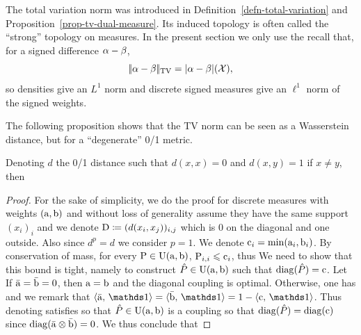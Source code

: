 The total variation norm was introduced in Definition~\ref{defn-total-variation} and Proposition~\ref{prop-tv-dual-measure}. Its induced topology is often called the ``strong'' topology on measures. In the present section we only use the recall that, for a signed difference $\al-\be$,
\[
	\norm{\al-\be}_{\TV}=|\al-\be|(\Xx),
\]
so densities give an $L^1$ norm and discrete signed measures give an $\ell^1$ norm of the signed weights.

The following proposition shows that the TV norm can be seen as a Wasserstein distance, but for a ``degenerate'' 0/1 metric.

\begin{prop}\label{prop-rel-wass-tv}
	Denoting $d$ the 0/1 distance such that $d(x,x)=0$ and $d(x,y)=1$ if $x \neq y$, then
\end{prop}
\begin{proof}
	For the sake of simplicity, we do the proof for discrete measures with weights $(\a,\b)$ and without loss of generality assume they have the same support $(x_i)_i$ and we denote $\D \eqdef (d(x_i,x_j))_{i,j}$ which is 0 on the diagonal and one outside.
	Also since $d^p=d$ we consider $p=1$.
	We denote $\text{c}_i = \min(\a_i,\b_i)$.
		By conservation of mass, for every $\P \in \CouplingsD(\a,\b)$, $\P_{i,i} \leq \text{c}_i$, thus
	We need to show that this bound is tight, namely to construct $\hat P \in \CouplingsD(\a,\b)$ such that
	$\diag(\hat P)=\text{c}$. Let
	If $\bar\a=\bar\b=0$, then $\a=\b$ and the diagonal coupling is optimal. Otherwise, one has
		\eq{
			\frac{ \bar\a \otimes \bar\b }{ \dotp{\bar\a}{\ones} } \in \CouplingsD(\bar\a,\bar\b)
		}
		and we remark that $\dotp{\bar\a}{\ones} = \dotp{\bar\b}{\ones} = 1-\dotp{\text{c}}{\ones}$.
		Thus denoting
	satisfies
		so that $\hat P \in \CouplingsD(\a,\b)$  is a coupling so that $\diag(\hat P) = \diag(\text{c})$ since $\diag( \bar\a \otimes \bar\b )=0$. We thus conclude that
\end{proof}



